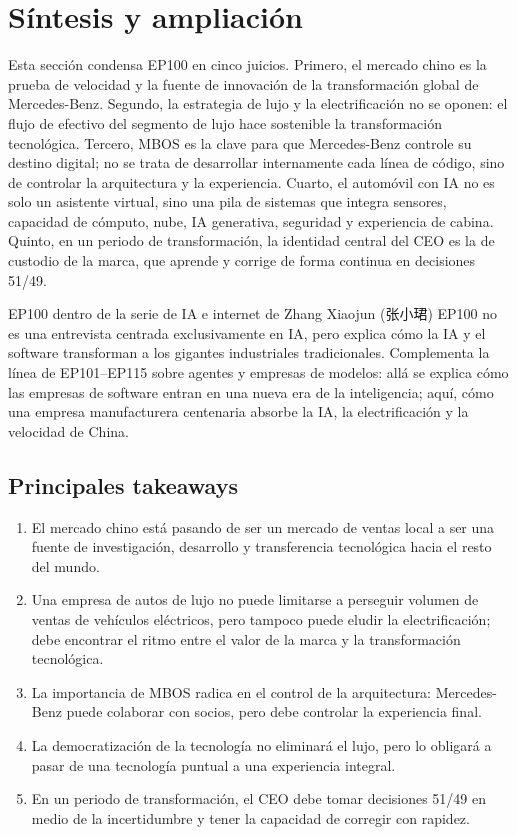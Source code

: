 \section{Síntesis y ampliación}

Esta sección condensa EP100 en cinco juicios. Primero, el mercado chino es la prueba de velocidad y la fuente de innovación de la transformación global de Mercedes-Benz. Segundo, la estrategia de lujo y la electrificación no se oponen: el flujo de efectivo del segmento de lujo hace sostenible la transformación tecnológica. Tercero, MBOS es la clave para que Mercedes-Benz controle su destino digital; no se trata de desarrollar internamente cada línea de código, sino de controlar la arquitectura y la experiencia. Cuarto, el automóvil con IA no es solo un asistente virtual, sino una pila de sistemas que integra sensores, capacidad de cómputo, nube, IA generativa, seguridad y experiencia de cabina. Quinto, en un periodo de transformación, la identidad central del CEO es la de custodio de la marca, que aprende y corrige de forma continua en decisiones 51/49.

\begin{importantbox}{EP100 dentro de la serie de IA e internet de Zhang Xiaojun (张小珺)}
EP100 no es una entrevista centrada exclusivamente en IA, pero explica cómo la IA y el software transforman a los gigantes industriales tradicionales. Complementa la línea de EP101--EP115 sobre agentes y empresas de modelos: allá se explica cómo las empresas de software entran en una nueva era de la inteligencia; aquí, cómo una empresa manufacturera centenaria absorbe la IA, la electrificación y la velocidad de China.
\end{importantbox}

\subsection{Principales takeaways}

\begin{enumerate}
\item El mercado chino está pasando de ser un mercado de ventas local a ser una fuente de investigación, desarrollo y transferencia tecnológica hacia el resto del mundo.
\item Una empresa de autos de lujo no puede limitarse a perseguir volumen de ventas de vehículos eléctricos, pero tampoco puede eludir la electrificación; debe encontrar el ritmo entre el valor de la marca y la transformación tecnológica.
\item La importancia de MBOS radica en el control de la arquitectura: Mercedes-Benz puede colaborar con socios, pero debe controlar la experiencia final.
\item La democratización de la tecnología no eliminará el lujo, pero lo obligará a pasar de una tecnología puntual a una experiencia integral.
\item En un periodo de transformación, el CEO debe tomar decisiones 51/49 en medio de la incertidumbre y tener la capacidad de corregir con rapidez.
\end{enumerate}


